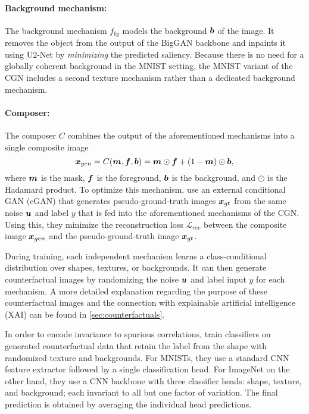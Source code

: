 \paragraph{Background mechanism:} The background mechanism $f_{bg}$ models the background $\boldsymbol{b}$ of the image. It removes the object from the output of the BigGAN backbone and inpaints it using U2-Net by \emph{minimizing} the predicted saliency. Because there is no need for a globally coherent background in the MNIST setting, the MNIST variant of the CGN includes a second texture mechanism rather than a dedicated background mechanism.
\paragraph{Composer:} The composer $C$ combines the output of the aforementioned mechanisms into a single composite image
\begin{equation} \label{eq:composer}
    \boldsymbol{x}_{gen} = C(\boldsymbol{m}, \boldsymbol{f}, \boldsymbol{b}) = \boldsymbol{m} \odot \boldsymbol{f} + (1 - \boldsymbol{m}) \odot \boldsymbol{b},
\end{equation}
where $\boldsymbol{m}$ is the mask, $\boldsymbol{f}$ is the foreground, $\boldsymbol{b}$ is the background, and $\odot$ is the Hadamard product. To optimize this mechanism, \citeauthor{Sauer2021ICLR} use an external conditional GAN (cGAN) that generates pseudo-ground-truth images $\boldsymbol{x}_{gt}$ from the same noise $\boldsymbol{u}$ and label $y$ that is fed into the aforementioned mechanisms of the CGN. Using this, they minimize the reconstruction loss $\mathcal{L}_{rec}$ between the composite image $\boldsymbol{x}_{gen}$ and the pseudo-ground-truth image $\boldsymbol{x}_{gt}$.

During training, each independent mechanism learns a class-conditional distribution over shapes, textures, or backgrounds. It can then generate counterfactual images by randomizing the noise $\boldsymbol{u}$ and label input $y$ for each mechanism. A more detailed explanation regarding the purpose of these counterfactual images and the connection with explainable artificial intelligence (XAI) can be found in \cref{sec:counterfactuals}.

In order to encode invariance to spurious correlations, \citeauthor{Sauer2021ICLR} train classifiers on generated counterfactual data that retain the label from the shape with randomized texture and backgrounds. For MNISTs, they use a standard CNN feature extractor followed by a single classification head. For ImageNet on the other hand, they use a CNN backbone with three classifier heads: shape, texture, and background; each invariant to all but one factor of variation. The final prediction is obtained by averaging the individual head predictions.
